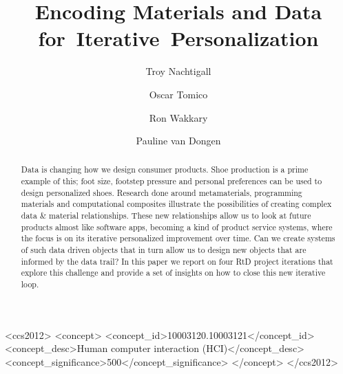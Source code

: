 \documentclass[sigconf]{acmart}
\begin{document}
\title{Encoding Materials and Data  for~Iterative~Personalization
}
\subtitle{}


\author{Troy Nachtigall}

\author{Oscar Tomico}

\author{Ron Wakkary}

\author{Pauline van Dongen}

\renewcommand{\shortauthors}{T. Nachtigall et al.}


\begin{abstract}
Data is changing how we design consumer products. Shoe production is a prime example of this; foot size, footstep pressure and personal preferences can be used to design personalized shoes. Research done around metamaterials, programming materials and computational composites illustrate the possibilities of creating complex data \& material relationships. These new relationships allow us to look at future products almost like software apps, becoming a kind of product service systems, where the focus is on its iterative personalized improvement over time. Can we create systems of such data driven objects that in turn allow us to design new objects that are informed by the data trail? In this paper we report on four RtD project iterations that explore this challenge and provide a set of insights on how to close this new iterative loop.
\end{abstract}

%
%
\begin{CCSXML}
<ccs2012>
<concept>
<concept_id>10003120.10003121</concept_id>
<concept_desc>Human computer interaction (HCI)</concept_desc>
<concept_significance>500</concept_significance>
</concept>
</ccs2012>
\end{CCSXML}

\end{document}
